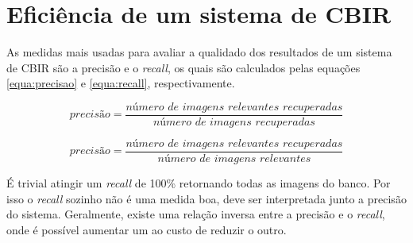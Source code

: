 \section{Eficiência de um sistema de CBIR}

As medidas mais usadas para avaliar a qualidado dos resultados de um sistema de CBIR são a precisão e o \textit{recall}, os quais são calculados pelas equações \ref{equa:precisao} e \ref{equa:recall}, respectivamente.

\begin{equation}
	\textit{precisão} = \frac{\textit{número de imagens relevantes recuperadas}}{\textit{número de imagens recuperadas}}
	\label{equa:precisao}
\end{equation}

\begin{equation}
	\textit{precisão} = \frac{\textit{número de imagens relevantes recuperadas}}{\textit{número de imagens relevantes}}
	\label{equa:recall}
\end{equation}

É trivial atingir um \textit{recall} de 100\% retornando todas as imagens do banco. Por isso o \textit{recall} sozinho não é uma medida boa, deve ser interpretada junto a precisão do sistema. Geralmente, existe uma relação inversa entre a precisão e o \textit{recall}, onde é possível aumentar um ao custo de reduzir o outro.

